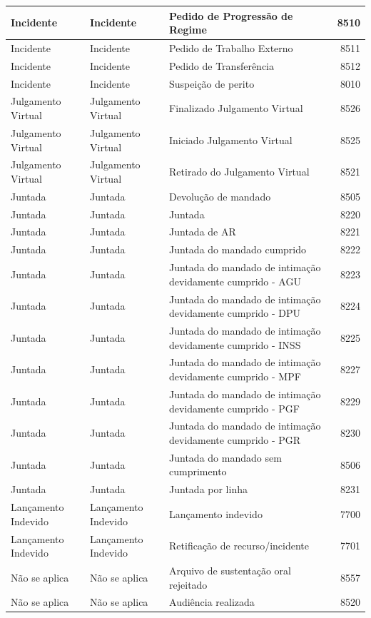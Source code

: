 \documentclass[
]{book}
\begin{document}
\begin{tabular}{l|l|l|r}
\hline
Incidente & Incidente & Pedido de Progressão de Regime & 8510\\
\hline
Incidente & Incidente & Pedido de Trabalho Externo & 8511\\
\hline
Incidente & Incidente & Pedido de Transferência & 8512\\
\hline
Incidente & Incidente & Suspeição de perito & 8010\\
\hline
Julgamento Virtual & Julgamento Virtual & Finalizado Julgamento Virtual & 8526\\
\hline
Julgamento Virtual & Julgamento Virtual & Iniciado Julgamento Virtual & 8525\\
\hline
Julgamento Virtual & Julgamento Virtual & Retirado do Julgamento Virtual & 8521\\
\hline
Juntada & Juntada & Devolução de mandado & 8505\\
\hline
Juntada & Juntada & Juntada & 8220\\
\hline
Juntada & Juntada & Juntada de AR & 8221\\
\hline
Juntada & Juntada & Juntada do mandado cumprido & 8222\\
\hline
Juntada & Juntada & Juntada do mandado de intimação devidamente cumprido - AGU & 8223\\
\hline
Juntada & Juntada & Juntada do mandado de intimação devidamente cumprido - DPU & 8224\\
\hline
Juntada & Juntada & Juntada do mandado de intimação devidamente cumprido - INSS & 8225\\
\hline
Juntada & Juntada & Juntada do mandado de intimação devidamente cumprido - MPF & 8227\\
\hline
Juntada & Juntada & Juntada do mandado de intimação devidamente cumprido - PGF & 8229\\
\hline
Juntada & Juntada & Juntada do mandado de intimação devidamente cumprido - PGR & 8230\\
\hline
Juntada & Juntada & Juntada do mandado sem cumprimento & 8506\\
\hline
Juntada & Juntada & Juntada por linha & 8231\\
\hline
Lançamento Indevido & Lançamento Indevido & Lançamento indevido & 7700\\
\hline
Lançamento Indevido & Lançamento Indevido & Retificação de recurso/incidente & 7701\\
\hline
Não se aplica & Não se aplica & Arquivo de sustentação oral rejeitado & 8557\\
\hline
Não se aplica & Não se aplica & Audiência realizada & 8520\\

\end{tabular}
\end{document}
